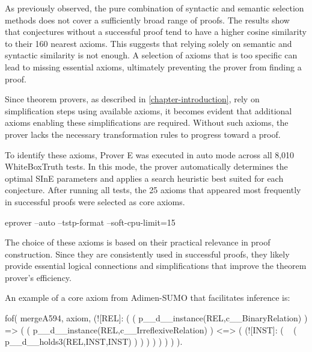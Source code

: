 \documentclass[english,version-2020-11]{uzl-thesis}
\begin{document}
As previously observed, the pure combination of syntactic and semantic selection methods does not cover a sufficiently broad range of proofs. The results show that conjectures without a successful proof tend to have a higher cosine similarity to their 160 nearest axioms. This suggests that relying solely on semantic and syntactic similarity is not enough. A selection of axioms that is too specific can lead to missing essential axioms, ultimately preventing the prover from finding a proof.

Since theorem provers, as described in \ref{chapter-introduction}, rely on simplification steps using available axioms, it becomes evident that additional axioms enabling these simplifications are required. Without such axioms, the prover lacks the necessary transformation rules to progress toward a proof.

To identify these axioms, Prover E was executed in auto mode across all 8,010 WhiteBoxTruth tests. In this mode, the prover automatically determines the optimal SInE parameters and applies a search heuristic best suited for each conjecture. After running all tests, the 25 axioms that appeared most frequently in successful proofs were selected as core axioms.

\begin{Pseudocode}[morekeywords = {add, create}, deletekeywords={to}, numbers=left,
    caption = {Prover E configuration}]
    eprover --auto --tstp-format --soft-cpu-limit=15
\end{Pseudocode}


The choice of these axioms is based on their practical relevance in proof construction. Since they are consistently used in successful proofs, they likely provide essential logical connections and simplifications that improve the theorem prover's efficiency.

An example of a core axiom from Adimen-SUMO that facilitates inference is:


\begin{Pseudocode}[morekeywords = {add, create}, deletekeywords={to}, numbers=left, caption = {Example core axiom}]
    fof( mergeA594, axiom,
        (![REL]: 
            (
                (
                    p__d__instance(REL,c__BinaryRelation)
                )
                =>
                (
                    (
                        p__d__instance(REL,c__IrreflexiveRelation)
                    )
                    <=>
                    (
                        (![INST]: 
                            (
                                ~ (
                                    p__d__holds3(REL,INST,INST)
                                )
                            )
                        )
                    )
                )
            )
        )
    ).
\end{Pseudocode}
\end{document}
